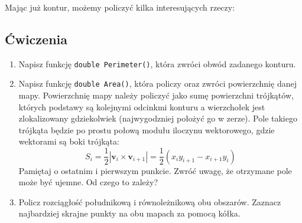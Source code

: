 \documentclass{instrukcja}
\begin{document}
Mając już kontur, możemy policzyć kilka interesujących rzeczy:

\subsection*{Ćwiczenia}
\begin{enumerate}
\item Napisz funkcję {\tt double Perimeter()}, która zwróci obwód zadanego konturu.
\item Napisz funkcję {\tt double Area()}, która policzy oraz zwróci powierzchnię danej mapy. Powierzchnię mapy należy policzyć jako sumę powierzchni trójkątów, których podstawy są kolejnymi odcinkmi konturu a wierzchołek jest zlokalizowany gdziekolwiek (najwygodzniej położyć go w zerze). Pole takiego trójkąta będzie po prostu połową modułu iloczynu wektorowego, gdzie wektorami są boki trójkąta:
\begin{displaymath}
S_{i}=\frac{1}{2} | \boldsymbol v_i\times \boldsymbol v_{i+1} | = \frac{1}{2} (x_iy_{i+1}-x_{i+1}y_i)
\end{displaymath}
Pamiętaj o ostatnim i pierwszym punkcie. Zwróć uwagę, że otrzymane pole może być ujemne. Od czego to zależy?
\item Policz rozciągłość południkową i równoleżnikową obu obszarów. Zaznacz najbardziej skrajne punkty na obu mapach za pomocą kółka.
\end{enumerate}
\end{document}
